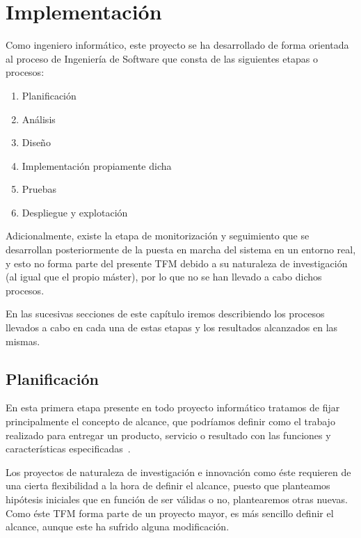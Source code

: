 \graphicspath{{capitulos/Capitulo4-Implementacion/recursos/}}

\section{Implementación} \label{capitulo:4}

Como ingeniero informático, este proyecto se ha desarrollado de forma orientada al proceso de Ingeniería de Software que consta de las siguientes etapas o procesos: 
\begin{enumerate}
	\item Planificación
	\item Análisis
	\item Diseño
	\item Implementación propiamente dicha
	\item Pruebas
	\item Despliegue y explotación    
\end{enumerate}
Adicionalmente, existe la etapa de monitorización y seguimiento que se desarrollan posteriormente de la puesta en marcha del sistema en un entorno real, y esto no forma parte del presente TFM debido a su naturaleza de investigación (al igual que el propio máster), por lo que no se han llevado a cabo dichos procesos.

En las sucesivas secciones de este capítulo iremos describiendo los procesos llevados a cabo en cada una de estas etapas y los resultados alcanzados en las mismas. %

\subsection{Planificación}
\label{sec:4:planificacion}
En esta primera etapa presente en todo proyecto informático tratamos de fijar principalmente el concepto de alcance, que podríamos definir como el trabajo realizado para entregar un producto, servicio o resultado con
las funciones y características especificadas~\cite{PMBOK}.

Los proyectos de naturaleza de investigación e innovación como éste requieren de una cierta flexibilidad a la hora de definir el alcance, puesto que planteamos hipótesis iniciales que en función de ser válidas o no, plantearemos otras nuevas. Como éste TFM forma parte de un proyecto mayor, es más sencillo definir el alcance, aunque este ha sufrido alguna modificación.


